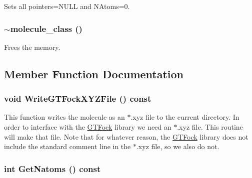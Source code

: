 Sets all pointers=NULL and NAtoms=0. \hypertarget{classJKBuilder_1_1molecule__class_ae8b7f222e2b1b67f0b5d078456e6b6bc}{
\subsubsection[{$\sim$molecule\_\-class}]{\setlength{\rightskip}{0pt plus 5cm}$\sim${\bf molecule\_\-class} ()}}
\label{classJKBuilder_1_1molecule__class_ae8b7f222e2b1b67f0b5d078456e6b6bc}


Frees the memory. 

\subsection{Member Function Documentation}
\hypertarget{classJKBuilder_1_1molecule__class_a16b721cec672dda3fc1a3c90e3d71120}{
\subsubsection[{WriteGTFockXYZFile}]{\setlength{\rightskip}{0pt plus 5cm}void WriteGTFockXYZFile () const}}
\label{classJKBuilder_1_1molecule__class_a16b721cec672dda3fc1a3c90e3d71120}


This function writes the molecule as an $\ast$.xyz file to the current directory. In order to interface with the \hyperlink{namespaceGTFock}{GTFock} library we need an $\ast$.xyz file. This routine will make that file. Note that for whatever reason, the \hyperlink{namespaceGTFock}{GTFock} library does not include the standard comment line in the $\ast$.xyz file, so we also do not. \hypertarget{classJKBuilder_1_1molecule__class_abb0ac82b97b1f6476539eb2b712bbceb}{
\subsubsection[{GetNatoms}]{\setlength{\rightskip}{0pt plus 5cm}int GetNatoms () const}}
\label{classJKBuilder_1_1molecule__class_abb0ac82b97b1f6476539eb2b712bbceb}


